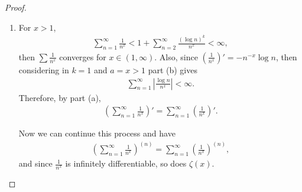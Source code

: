\documentclass[11pt]{article}
\theoremstyle{definition}
\numberwithin{equation}{subsection}
\begin{document}
\begin{proof}
\begin{enumerate}[label=(\alph*)]
    \item For $x > 1$, 
    \begin{align*}
        \sum^\infty_{n=1} \frac{1}{n^x} < 1 + \sum^\infty_{n=2} \frac{(\log n)^k}{n^x} < \infty,
    \end{align*}
    then $\sum \frac{1}{n^x}$ converges for $x \in (1, \infty)$. Also, since $\left(\frac{1}{n^x}\right)' = - n^{-x} \log n$, then considering in $k = 1$ and $a = x > 1$ part (b) gives
    \begin{align*}
        \sum^\infty_{n=1} \left|\frac{\log n}{n^x} \right| < \infty.
    \end{align*}
    Therefore, by part (a),
    \begin{align*}
        \left(\sum^\infty_{n=1} \frac{1}{n^x}\right)' = \sum^\infty_{n=1} \left(\frac{1}{n^x}\right)'.
    \end{align*}
    
    Now we can continue this process and have
    \begin{align*}
        \left(\sum^\infty_{n=1} \frac{1}{n^x}\right)^{(n)} = \sum^\infty_{n=1} \left(\frac{1}{n^x}\right)^{(n)},
    \end{align*}
    and since $\frac{1}{n^x}$ is infinitely differentiable, so does $\zeta(x)$.
\end{enumerate}
\end{proof}

\medskip
\end{document}
